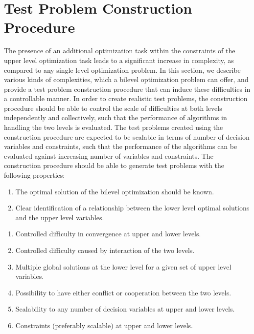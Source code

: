 \documentclass[twoside]{article}
\begin{document}
\section{Test Problem Construction Procedure}\label{sec:framework}
The presence of an additional optimization task within the constraints of the upper level optimization task leads to a significant increase in complexity, as compared to any single level optimization problem. In this section, we describe various kinds of complexities, which a bilevel optimization problem can offer, and provide a test problem construction procedure that can induce these difficulties in a controllable manner. In order to create realistic test problems, the construction procedure should be able to control the scale of difficulties at both levels independently and collectively, such that the performance of algorithms in handling the two levels is evaluated. The test problems created using the construction procedure are expected to be scalable in terms of number of decision variables and constraints, such that the performance of the algorithms can be evaluated against increasing number of variables and constraints. The construction procedure should be able to generate test problems with the following properties:

\vspace{2mm}

\hspace{-7mm}{\bf Necessary Properties:}
\begin{enumerate}
\item The optimal solution of the bilevel optimization should be known.
\item Clear identification of a relationship between the lower level optimal solutions and the upper level variables.
\end{enumerate}

\hspace{-7mm}{\bf Properties for inducing difficulties:}
\begin{enumerate}
\item Controlled difficulty in convergence at upper and lower levels.
\item Controlled difficulty caused by interaction of the two levels.
\item Multiple global solutions at the lower level for a given set of upper level variables.
\item Possibility to have either conflict or cooperation between the two levels.
\item Scalability to any number of decision variables at upper and lower levels.
\item Constraints (preferably scalable) at upper and lower levels.
\end{enumerate}
\end{document}
